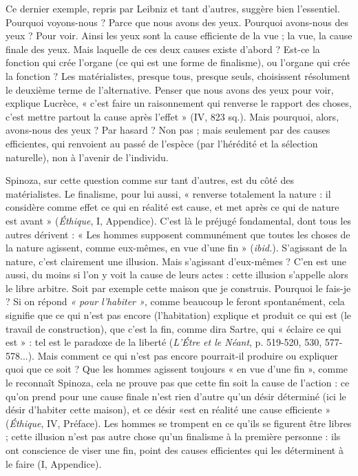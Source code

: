 Ce dernier exemple, repris par Leibniz et tant d’autres, suggère bien l’essentiel.
Pourquoi voyons-nous ? Parce que nous avons des yeux. Pourquoi avons-nous
des yeux ? Pour voir. Ainsi les yeux sont la cause efficiente de la vue ; la
vue, la cause finale des yeux. Mais laquelle de ces deux causes existe d’abord ?
Est-ce la fonction qui crée l’organe (ce qui est une forme de finalisme), ou
l'organe qui crée la fonction ? Les matérialistes, presque tous, presque seuls,
choisissent résolument le deuxième terme de l'alternative. Penser que nous
avons des yeux pour voir, explique Lucrèce, « c’est faire un raisonnement qui
renverse le rapport des choses, c’est mettre partout la cause après l’effet » (IV,
823 sq.). Mais pourquoi, alors, avons-nous des yeux ? Par hasard ? Non pas ;
mais seulement par des causes efficientes, qui renvoient au passé de l’espèce
(par l’hérédité et la sélection naturelle), non à l’avenir de l’individu.

Spinoza, sur cette question comme sur tant d’autres, est du côté des matérialistes.
Le finalisme, pour lui aussi, « renverse totalement la nature : il considère
comme effet ce qui en réalité est cause, et met après ce qui de nature est
avant » ({\it Éthique}, I, Appendice). C’est là le préjugé fondamental, dont tous les
autres dérivent : « Les hommes supposent communément que toutes les choses
de la nature agissent, comme eux-mêmes, en vue d’une fin » ({\it ibid.}). S'agissant
de la nature, c’est clairement une illusion. Mais s'agissant d’eux-mêmes ? C'en
est une aussi, du moins si l’on y voit la cause de leurs actes : cette illusion
s'appelle alors le libre arbitre. Soit par exemple cette maison que je construis.
Pourquoi le fais-je ? Si on répond {\it « pour l'habiter »}, comme beaucoup le feront
spontanément, cela signifie que ce qui n’est pas encore (l’habitation) explique
et produit ce qui est (le travail de construction), que c’est la fin, comme dira
Sartre, qui « éclaire ce qui est » : tel est le paradoxe de la liberté ({\it L'Étre et le
Néant}, p. 519-520, 530, 577-578...). Mais comment ce qui n’est pas encore
pourrait-il produire ou expliquer quoi que ce soit ? Que les hommes agissent
toujours « en vue d’une fin », comme le reconnaît Spinoza, cela ne prouve pas
que cette fin soit la cause de l’action : ce qu’on prend pour une cause finale
n’est rien d’autre qu’un désir déterminé (ici le désir d’habiter cette maison),
et ce désir «est en réalité une cause efficiente » ({\it Éthique}, IV, Préface). Les
hommes se trompent en ce qu’ils se figurent être libres ; cette illusion n’est
pas autre chose qu’un finalisme à la première personne : ils ont conscience de
viser une fin, point des causes efficientes qui les déterminent à le faire
(I, Appendice).

